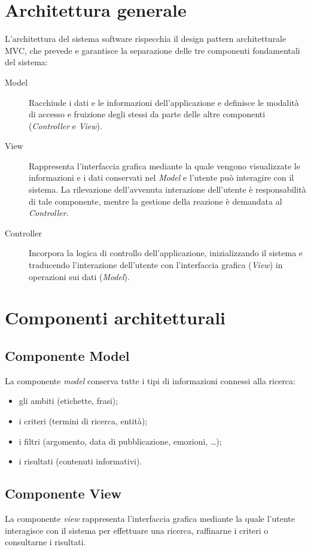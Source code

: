 \documentclass[10pt,a4paper,headinclude,footinclude,hidelinks]{scrreprt} %
\begin{document}
	\section{Architettura generale}
	\label{sec:stage:design:architettura:mvc}
	L'architettura del sistema software rispecchia il design pattern architetturale MVC, che prevede e garantisce la separazione delle tre componenti fondamentali del sistema:
	\begin{description}
	\item[Model] Racchiude i dati e le informazioni dell'applicazione e definisce le modalità di accesso e fruizione degli stessi da parte delle altre componenti (\textit{Controller} e \textit{View}).
 	\item[View] Rappresenta l'interfaccia grafica mediante la quale vengono visualizzate le informazioni e i dati conservati nel \textit{Model} e l'utente può interagire con il sistema. La rilevazione dell'avvenuta interazione dell'utente è responsabilità di tale componente, mentre la gestione della reazione è demandata al \textit{Controller}.
	\item[Controller] Incorpora la logica di controllo dell'applicazione, inizializzando il sistema e traducendo l'interazione dell'utente con l'interfaccia grafica (\textit{View}) in operazioni sui dati (\textit{Model}).
	\end{description}

	\section{Componenti architetturali}
	\label{sec:stage:design:mvc}

	\subsection{Componente Model}
	\label{sec:stage:design:mvc:model}
	La componente \textit{model} conserva tutte i tipi di informazioni connessi alla ricerca:
	\begin{itemize}
	\item gli ambiti (etichette, frasi);
	\item i criteri (termini di ricerca, entità);
	\item i filtri (argomento, data di pubblicazione, emozioni, \ldots);
	\item i risultati (contenuti informativi).
	\end{itemize}

	\subsection{Componente View}
	\label{sec:stage:design:mvc:view}
	La componente \textit{view} rappresenta l'interfaccia grafica mediante la quale l'utente interagisce con il sistema per effettuare una ricerca, raffinarne i criteri o consultarne i risultati.
\end{document}

